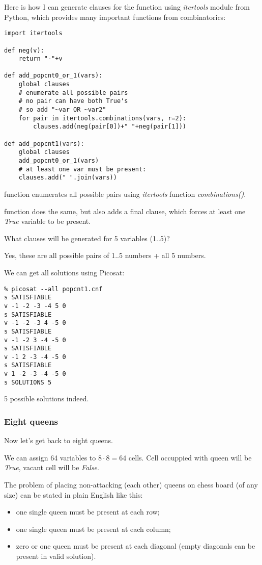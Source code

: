 Here is how I can generate clauses for the function using \textit{itertools} module from Python,
which provides many important functions from combinatorics:

\begin{lstlisting}
import itertools

def neg(v):
    return "-"+v

def add_popcnt0_or_1(vars):
    global clauses
    # enumerate all possible pairs
    # no pair can have both True's
    # so add "~var OR ~var2"
    for pair in itertools.combinations(vars, r=2):
        clauses.add(neg(pair[0])+" "+neg(pair[1]))

def add_popcnt1(vars):
    global clauses
    add_popcnt0_or_1(vars)
    # at least one var must be present:
    clauses.add(" ".join(vars))
\end{lstlisting}

 function enumerates all possible pairs using \textit{itertools} function
\textit{combinations()}.

 function does the same, but also adds a final clause, which forces at least one
\textit{True} variable to be present.

What clauses will be generated for 5 variables (1..5)?



Yes, these are all possible pairs of 1..5 numbers + all 5 numbers.

We can get all solutions using Picosat:

\begin{lstlisting}
% picosat --all popcnt1.cnf
s SATISFIABLE
v -1 -2 -3 -4 5 0
s SATISFIABLE
v -1 -2 -3 4 -5 0
s SATISFIABLE
v -1 -2 3 -4 -5 0
s SATISFIABLE
v -1 2 -3 -4 -5 0
s SATISFIABLE
v 1 -2 -3 -4 -5 0
s SOLUTIONS 5
\end{lstlisting}

5 possible solutions indeed.

\subsubsection{Eight queens}

Now let's get back to eight queens.

We can assign 64 variables to $8 \cdot 8=64$ cells.
Cell occuppied with queen will be \textit{True}, vacant cell will be \textit{False}.

The problem of placing non-attacking (each other) queens on chess board (of any size) can be stated in plain English like this:
\begin{itemize}
\item one single queen must be present at each row;

\item one single queen must be present at each column;

\item zero or one queen must be present at each diagonal (empty diagonals can be present in valid solution).
\end{itemize}

